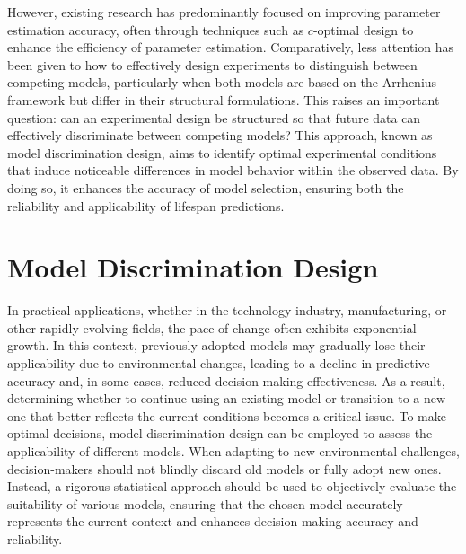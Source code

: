 \hspace*{8mm} However, existing research has predominantly focused on improving parameter estimation accuracy, often through techniques such as $c$-optimal design to enhance the efficiency of parameter estimation. Comparatively, less attention has been given to how to effectively design experiments to distinguish between competing models, particularly when both models are based on the Arrhenius framework but differ in their structural formulations. This raises an important question: can an experimental design be structured so that future data can effectively discriminate between competing models? This approach, known as model discrimination design, aims to identify optimal experimental conditions that induce noticeable differences in model behavior within the observed data. By doing so, it enhances the accuracy of model selection, ensuring both the reliability and applicability of lifespan predictions.

\section{Model Discrimination Design}

\hspace*{8mm} In practical applications, whether in the technology industry, manufacturing, or other rapidly evolving fields, the pace of change often exhibits exponential growth. In this context, previously adopted models may gradually lose their applicability due to environmental changes, leading to a decline in predictive accuracy and, in some cases, reduced decision-making effectiveness. As a result, determining whether to continue using an existing model or transition to a new one that better reflects the current conditions becomes a critical issue. To make optimal decisions, model discrimination design can be employed to assess the applicability of different models. When adapting to new environmental challenges, decision-makers should not blindly discard old models or fully adopt new ones. Instead, a rigorous statistical approach should be used to objectively evaluate the suitability of various models, ensuring that the chosen model accurately represents the current context and enhances decision-making accuracy and reliability.

